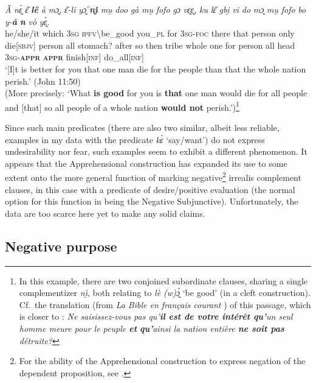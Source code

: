 \documentclass[output=paper,colorlinks,citecolor=brown]{langscibook}
\begin{document}
\ea \label{ex:Fed54}
\gll \textit{Ȁ} \textit{nɛ̰̀} \textit{ɛ̏} \textit{\textbf{lȅ {\OO}}} \textit{à} \textit{mɔ̰,} \textit{ɛ̏-li} \textit{yɔ̰̈} \textit{\textbf{nı̰́}} \textit{mṵ} \textit{doo} \textit{gà} \textit{mṵ} \textit{fofo} \textit{gɔ} \textit{vɛ̰ɛ̰,} \textit{ku} \textit{lɛ̏} \textit{gbḭ} \textit{vi} \textit{do} \textit{mɔ̰} \textit{mṵ} \textit{fofo} \textit{bo} \textit{y-\textbf{ǎ}} \textit{\textbf{n{\ù}}} \textit{vò} \textit{yɛ̰̀.} \\
he/she/it which \textsc{3sg} \textsc{ipfv\backslash}be\_good you\_\textsc{pl} for \textsc{3sg-foc} there that person only die[\textsc{sbjv}] person all stomach? after so then tribe whole one for person all head \textsc{3sg-\textbf{appr}} \textsc{\textbf{appr}} finish[\textsc{inf}] do\_all[\textsc{inf}] \\
\glt `[I]t is better for you that one man die for the people than that the whole nation perish.' (John 11:50) \\
(More precisely: `What \textbf{is good} for you is \textbf{that} one man would die for all people and [that] so all people of a whole nation \textbf{would not} perish.')\footnote{In this example, there are two conjoined subordinate clauses, sharing a single complementizer \textit{nı̰́}, both relating to \textit{lè (w)ɔ̰́} `be good' (in a cleft construction). Cf.\ the  translation (from \textit{La Bible en français courant} \citep{BFC}) of this passage, which is closer to : \textit{Ne saisissez-vous pas qu'\textbf{il est de votre intérêt qu'}un seul homme meure pour le peuple \textbf{et} \textbf{qu'}ainsi la nation entière \textbf{ne soit pas} détruite?}}
\z


 Since such main predicates (there are also two similar, albeit less reliable, examples in my data with the predicate \textit{kɛ̀} `say\slash want') do not express undesirability nor fear, such examples seem to exhibit a different phenomenon. It appears that the Apprehensional construction has expanded its use to some extent onto the more general function of marking negative\footnote{For the ability of the Apprehensional construction to express negation of the dependent proposition, see .} irrealis complement clauses, in this case with a predicate of desire\slash positive evaluation (the normal option for this function in  being the Negative Subjunctive). Unfortunately, the data are too scarce here yet to make any solid claims.


\subsection{Negative purpose}
\label{subsec:negativepurpose}
\end{document}
